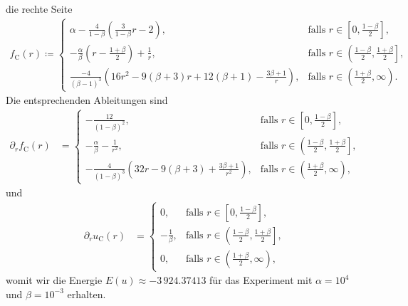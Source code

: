 die rechte Seite
\begin{align*}
  f_\textrm{C}(r)\coloneqq 
  \begin{cases}
    \alpha - \frac{4}{1-\beta}\left(\frac{3}{1-\beta}r - 2\right)\!, 
    & \text{falls } r\in \left[0,\frac{1-\beta}{2}\right]\!,\\
    -\frac{\alpha}{\beta}\left( r-\frac{1+\beta}{2} \right) +\frac{1}{r}, 
    & \text{falls } r\in \left(\frac{1-\beta}{2}, \frac{1+\beta}{2}\right]\!,\\
    \frac{-4}{(\beta-1)^3}
    \left( 16r^2 -9(\beta+3)r + 12(\beta+1) - \frac{3\beta+1}{r}\right)\!, 
    & \text{falls } r\in \left(\frac{1+\beta}{2},\infty\right)\!.
  \end{cases}
\end{align*}
Die entsprechenden Ableitungen sind
\begin{align*}
  \partial_r f_\textrm{C}(r) &= 
  \begin{cases}
    -\frac{12}{(1-\beta)^2},
    & \text{falls } r\in \left[0,\frac{1-\beta}{2}\right]\!,\\
    -\frac{\alpha}{\beta}-\frac{1}{r^2},
    & \text{falls } r\in \left(\frac{1-\beta}{2}, \frac{1+\beta}{2}\right]\!,\\
    -\frac{4}{(1-\beta)^3}\left( 32r-9(\beta+3)+\frac{3\beta+1}{r^2} \right)\!,
    & \text{falls } r\in \left(\frac{1+\beta}{2},\infty\right)\!,
  \end{cases}
\end{align*}
und
\begin{align*}
  \partial_r u_\textrm{C}(r) &= 
  \begin{cases}
    0,
    & \text{falls } r\in \left[0,\frac{1-\beta}{2}\right]\!,\\
    -\frac{1}{\beta},
    & \text{falls } r\in \left(\frac{1-\beta}{2}, \frac{1+\beta}{2}\right]\!,\\
    0,
    & \text{falls } r\in \left(\frac{1+\beta}{2},\infty\right)\!,
  \end{cases}
\end{align*}
womit wir die Energie
$E(u)\approx -3\,924.37413$ für das Experiment mit $\alpha=10^4$ und $\beta =
10^{-3}$ erhalten.
